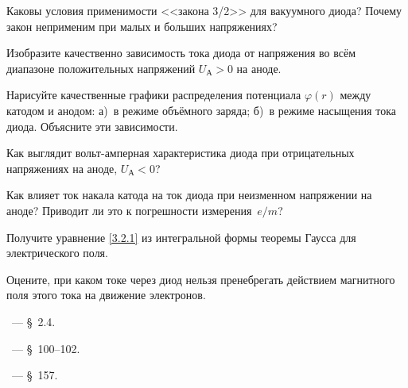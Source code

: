 \begin{lab:questions}
    
    \item Каковы условия применимости <<закона 3/2>> для вакуумного диода?
    Почему закон неприменим при малых и больших напряжениях?
    
    \item Изобразите качественно зависимость тока диода от напряжения
    во всём диапазоне положительных напряжений $U_{А}>0$ на аноде.
    
	\item Нарисуйте качественные графики распределения потенциала $\varphi(r)$ 
    между катодом и анодом: а)~в режиме объёмного заряда;
б)~в режиме насыщения тока диода. Объясните эти зависимости.

    \item Как выглядит вольт-амперная характеристика диода при отрицательных
    напряжениях на аноде, $U_{А}<0$?

	\item Как влияет ток накала катода на ток диода при неизменном напряжении
на аноде? Приводит ли это к погрешности измерения~$e/m$?

    \item Получите уравнение \eqref{3.2.1} из интегральной формы теоремы Гаусса
    для электрического поля.
    
    \item Оцените, при каком токе через диод нельзя пренебрегать
    действием магнитного поля этого тока на движение электронов.

\end{lab:questions}

\begin{lab:literature}
    \item \Kirichenko~--- \S~2.4.
	\item \SivuhinIII~--- \S~100--102.
	\item \Kalashnikov~--- \S~157.
\end{lab:literature}

